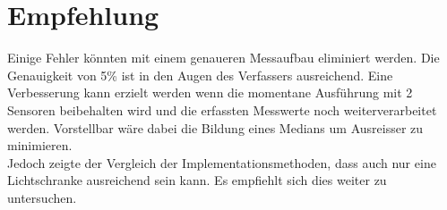 \section{Empfehlung}
Einige Fehler könnten mit einem genaueren Messaufbau eliminiert werden.
Die Genauigkeit von 5\% ist in den Augen des Verfassers ausreichend. Eine Verbesserung kann erzielt werden wenn die momentane Ausführung mit 2 Sensoren beibehalten wird und die erfassten Messwerte noch weiterverarbeitet werden. Vorstellbar wäre dabei die Bildung eines Medians um Ausreisser zu minimieren.\\

Jedoch zeigte der Vergleich der Implementationsmethoden, dass auch nur eine Lichtschranke ausreichend sein kann. Es empfiehlt sich dies weiter zu untersuchen.